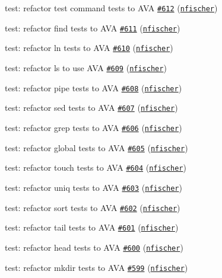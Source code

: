 \begin{DoxyItemize}
\item test\+: refactor \textquotesingle{}test\textquotesingle{} command tests to A\+VA \href{https://github.com/shelljs/shelljs/pull/612}{\tt \#612} (\href{https://github.com/nfischer}{\tt nfischer})
\item test\+: refactor find tests to A\+VA \href{https://github.com/shelljs/shelljs/pull/611}{\tt \#611} (\href{https://github.com/nfischer}{\tt nfischer})
\item test\+: refactor ln tests to A\+VA \href{https://github.com/shelljs/shelljs/pull/610}{\tt \#610} (\href{https://github.com/nfischer}{\tt nfischer})
\item test\+: refactor ls to use A\+VA \href{https://github.com/shelljs/shelljs/pull/609}{\tt \#609} (\href{https://github.com/nfischer}{\tt nfischer})
\item test\+: refactor pipe tests to A\+VA \href{https://github.com/shelljs/shelljs/pull/608}{\tt \#608} (\href{https://github.com/nfischer}{\tt nfischer})
\item test\+: refactor sed tests to A\+VA \href{https://github.com/shelljs/shelljs/pull/607}{\tt \#607} (\href{https://github.com/nfischer}{\tt nfischer})
\item test\+: refactor grep tests to A\+VA \href{https://github.com/shelljs/shelljs/pull/606}{\tt \#606} (\href{https://github.com/nfischer}{\tt nfischer})
\item test\+: refactor global tests to A\+VA \href{https://github.com/shelljs/shelljs/pull/605}{\tt \#605} (\href{https://github.com/nfischer}{\tt nfischer})
\item test\+: refactor touch tests to A\+VA \href{https://github.com/shelljs/shelljs/pull/604}{\tt \#604} (\href{https://github.com/nfischer}{\tt nfischer})
\item test\+: refactor uniq tests to A\+VA \href{https://github.com/shelljs/shelljs/pull/603}{\tt \#603} (\href{https://github.com/nfischer}{\tt nfischer})
\item test\+: refactor sort tests to A\+VA \href{https://github.com/shelljs/shelljs/pull/602}{\tt \#602} (\href{https://github.com/nfischer}{\tt nfischer})
\item test\+: refactor tail tests to A\+VA \href{https://github.com/shelljs/shelljs/pull/601}{\tt \#601} (\href{https://github.com/nfischer}{\tt nfischer})
\item test\+: refactor head tests to A\+VA \href{https://github.com/shelljs/shelljs/pull/600}{\tt \#600} (\href{https://github.com/nfischer}{\tt nfischer})
\item test\+: refactor mkdir tests to A\+VA \href{https://github.com/shelljs/shelljs/pull/599}{\tt \#599} (\href{https://github.com/nfischer}{\tt nfischer})

\end{DoxyItemize}
